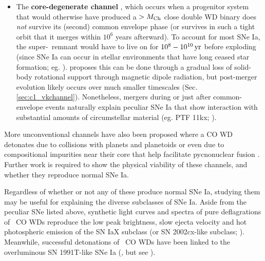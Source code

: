 \begin{itemize}
	\item The {\bf core-degenerate channel} \citep{livir03, kashs11, tsebs15}, which occurs when a progenitor system that would otherwise have produced a $>\Mch$ close double WD binary does \textit{not} survive its (second) common envelope phase (or survives in such a tight orbit that it merges within $10^6$ years afterward).  To account for most SNe Ia, the super-\Mch\ remnant would have to live on for $10^{8}-10^{10}\,\mathrm{yr}$ before exploding (since SNe Ia can occur in stellar environments that have long ceased star formation; eg. \citealt{prichs08, maozsg10}).  \cite{illks12} proposes this can be done through a gradual loss of solid-body rotational support through magnetic dipole radiation, but post-merger evolution likely occurs over much smaller timescales (Sec. \ref{sec:c1_vkchannel}).  Nonetheless, mergers during or just after common-envelope events naturally explain peculiar SNe Ia that show interaction with substantial amounts of circumstellar material (eg. PTF 11kx; \citealt{dild+12, soke13}).

\end{itemize}


More unconventional channels have also been proposed where a CO WD detonates due to collisions with planets and planetoids \citep{distfg15} or even due to compositional impurities near their core that help facilitate pycnonuclear fusion \citep{chio+15}.  Further work is required to show the physical viability of these channels, and whether they reproduce normal SNe Ia.  

Regardless of whether or not any of these produce normal SNe Ia, studying them may be useful for explaining the diverse subclasses of SNe Ia.  Aside from the peculiar SNe listed above, synthetic light curves and spectra of pure deflagrations of \Mch\ CO WDs \citep{phil+07, krom+13, fink+14} reproduce the low peak brightness, slow ejecta velocity and hot photospheric emission of the SN IaX subclass (or SN 2002cx-like subclass; \citealt{li+02, fole+13}).  Meanwhile, successful detonations of \Mch\ CO WDs have been linked to the overluminous SN 1991T-like SNe Ia (\citealt{fishj15}, but see \citealt{seit+16}).

